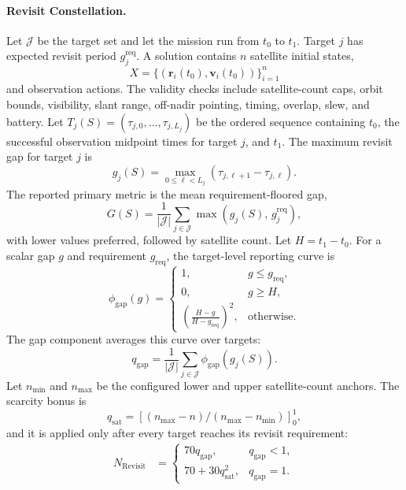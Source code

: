 \documentclass[11pt]{article}
\begin{document}
\paragraph{Revisit Constellation.} Let \(\mathcal{J}\) be the target set and let the mission run from \(t_0\) to \(t_1\). Target \(j\) has expected revisit period \(g^{\mathrm{req}}_j\). A solution contains \(n\) satellite initial states,
\[
  X=\{(\mathbf{r}_i(t_0),\mathbf{v}_i(t_0))\}_{i=1}^{n}
\]
and observation actions. The validity checks include satellite-count caps, orbit bounds, visibility, slant range, off-nadir pointing, timing, overlap, slew, and battery. Let \(T_j(S)=(\tau_{j,0},\ldots,\tau_{j,L_j})\) be the ordered sequence containing \(t_0\), the successful observation midpoint times for target \(j\), and \(t_1\). The maximum revisit gap for target \(j\) is
\[
  g_j(S)=\max_{0\le \ell<L_j}(\tau_{j,\ell+1}-\tau_{j,\ell}).
\]
The reported primary metric is the mean requirement-floored gap,
\[
  G(S)=\frac{1}{|\mathcal{J}|}\sum_{j\in\mathcal{J}}\max(g_j(S),\,g^{\mathrm{req}}_j),
\]
with lower values preferred, followed by satellite count. Let \(H=t_1-t_0\). For a scalar gap \(g\) and requirement \(g_{\mathrm{req}}\), the target-level reporting curve is
\[
  \phi_{\mathrm{gap}}(g)=
  \begin{cases}
    1, & g\le g_{\mathrm{req}},\\
    0, & g\ge H,\\
    \left(\frac{H-g}{H-g_{\mathrm{req}}}\right)^2, & \text{otherwise}.
  \end{cases}
\]
The gap component averages this curve over targets:
\[
  q_{\mathrm{gap}}=\frac{1}{|\mathcal{J}|}\sum_{j\in\mathcal{J}}\phi_{\mathrm{gap}}(g_j(S)).
\]
Let \(n_{\min}\) and \(n_{\max}\) be the configured lower and upper satellite-count anchors. The scarcity bonus is
\[
  q_{\mathrm{sat}}=\left[(n_{\max}-n)/(n_{\max}-n_{\min})\right]_0^1,
\]
and it is applied only after every target reaches its revisit requirement:
\[
  \begin{aligned}
  N_{\mathrm{Revisit}}&=
    \begin{cases}
      70q_{\mathrm{gap}}, & q_{\mathrm{gap}}<1,\\
      70+30q_{\mathrm{sat}}^2, & q_{\mathrm{gap}}=1.
    \end{cases}
  \end{aligned}
\]
\end{document}
